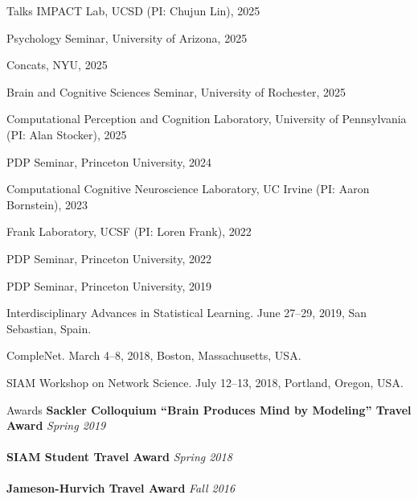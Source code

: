 \documentclass{resume} %
\begin{document}
\begin{rSection}{Talks}
IMPACT Lab, UCSD (PI: Chujun Lin), 2025

Psychology Seminar, University of Arizona, 2025

Concats, NYU, 2025

Brain and Cognitive Sciences Seminar, University of Rochester, 2025

Computational Perception and Cognition Laboratory, University of Pennsylvania (PI: Alan Stocker), 2025

PDP Seminar, Princeton University, 2024

Computational Cognitive Neuroscience Laboratory, UC Irvine (PI: Aaron Bornstein), 2023

Frank Laboratory, UCSF (PI: Loren Frank), 2022

PDP Seminar, Princeton University, 2022

PDP Seminar, Princeton University, 2019

Interdisciplinary Advances in Statistical Learning. June 27--29, 2019, San Sebastian, Spain.

CompleNet. March 4--8, 2018, Boston, Massachusetts, USA.

SIAM Workshop on Network Science. July 12--13, 2018, Portland, Oregon, USA.
\end{rSection}

\begin{rSection}{Awards}
    \textbf{Sackler Colloquium ``Brain Produces Mind by Modeling'' Travel Award} \hfill \emph{Spring 2019} \\
    \\
    \textbf{SIAM Student Travel Award} \hfill \emph{Spring 2018} \\
    \\
    \textbf{Jameson-Hurvich Travel Award} \hfill \emph{Fall 2016} \\
\end{rSection}

\end{document}

